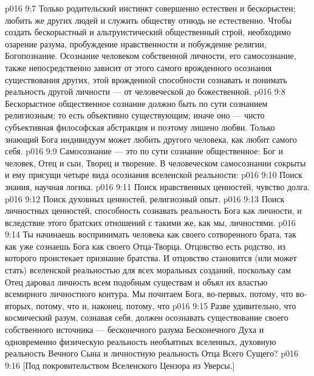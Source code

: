 \vs p016 9:7 \pc Только родительский инстинкт совершенно естествен и бескорыстен; любить же других людей и служить обществу отнюдь не естественно. Чтобы создать бескорыстный и альтруистический общественный строй, необходимо озарение разума, пробуждение нравственности и побуждение религии, Богопознание. Осознание человеком собственной личности, его самосознание, также непосредственно зависит от этого самого врожденного осознания существования других, этой врожденной способности сознавать и понимать реальность другой личности --- от человеческой до божественной.
\vs p016 9:8 Бескорыстное общественное сознание должно быть по сути сознанием религиозным; то есть объективно существующим; иначе оно --- чисто субъективная философская абстракция и поэтому лишено любви. Только знающий Бога индивидуум может любить другого человека, как любит самого себя.
\vs p016 9:9 Самосознание --- это по сути сознание общественное: Бог и человек, Отец и сын, Творец и творение. В человеческом самосознании сокрыты и ему присущи четыре вида осознания вселенской реальности:
\vs p016 9:10 \bibnobreakspace Поиск знания, научная логика.
\vs p016 9:11 \bibnobreakspace Поиск нравственных ценностей, чувство долга.
\vs p016 9:12 \bibnobreakspace Поиск духовных ценностей, религиозный опыт.
\vs p016 9:13 \bibnobreakspace Поиск личностных ценностей, способность сознавать реальность Бога как личности, и вследствие этого братских отношений с такими же, как мы, личностями.
\vs p016 9:14 \pc Ты начинаешь воспринимать человека как своего сотворенного брата, так как уже сознаешь Бога как своего Отца\hyp{}Творца. Отцовство есть родство, из которого проистекает признание братства. И отцовство становится (или может стать) вселенской реальностью для всех моральных созданий, поскольку сам Отец даровал личность всем подобным существам и объял их властью всемирного личностного контура. Мы почитаем Бога, во\hyp{}первых, потому, что  во\hyp{}вторых, потому, что  и, наконец, потому, что 
\vs p016 9:15 Разве удивительно, что космический разум, сознавая себя, должен осознавать существование своего собственного источника --- бесконечного разума Бесконечного Духа и одновременно физическую реальность необъятных вселенных, духовную реальность Вечного Сына и личностную реальность Отца Всего Сущего?
\vsetoff
\vs p016 9:16 [Под покровительством Вселенского Цензора из Уверсы.]
